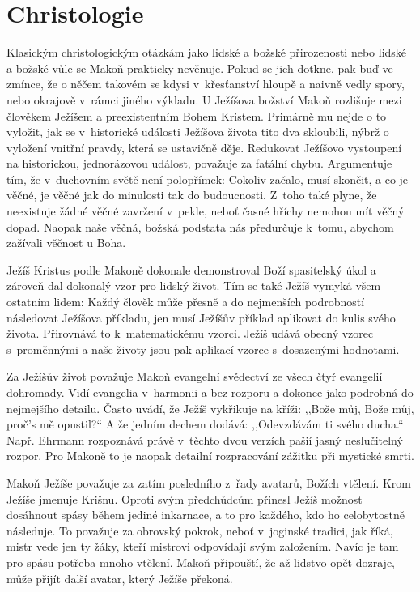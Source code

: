 \section{Christologie}

Klasickým christologickým otázkám jako lidské a božské přirozenosti nebo lidské
a božské vůle se Makoň prakticky nevěnuje. Pokud se jich dotkne, pak buď ve
zmínce, že o něčem takovém se kdysi v~křesťanství hloupě a naivně vedly spory,
nebo okrajově v~rámci jiného výkladu. U Ježíšova božství Makoň rozlišuje mezi
člověkem Ježíšem a preexistentním Bohem Kristem. Primárně mu nejde o to
vyložit, jak se v~historické události Ježíšova života tito dva skloubili, nýbrž
o vyložení vnitřní pravdy, která se ustavičně děje. Redukovat Ježíšovo
vystoupení na historickou, jednorázovou událost, považuje za fatální chybu.
Argumentuje tím, že v~duchovním světě není polopřímek: Cokoliv začalo, musí
skončit, a co je věčné, je věčné jak do minulosti tak do
budoucnosti. Z~toho
také plyne, že neexistuje žádné věčné zavržení v~pekle, neboť časné hříchy
nemohou mít věčný dopad. Naopak naše věčná, božská podstata nás předurčuje
k~tomu, abychom zažívali věčnost u Boha.

Ježíš Kristus podle Makoně dokonale demonstroval Boží spasitelský úkol a zároveň
dal dokonalý vzor pro lidský život. Tím se také Ježíš vymyká všem ostatním
lidem: Každý člověk může přesně a do nejmenších podrobností následovat Ježíšova
příkladu, jen musí Ježíšův příklad aplikovat do kulis svého života. Přirovnává
to k~matematickému vzorci. Ježíš udává obecný vzorec s~proměnnými a naše životy
jsou pak aplikací vzorce s~dosazenými hodnotami.

Za Ježíšův život považuje Makoň evangelní svědectví ze všech čtyř evangelií
dohromady. Vidí evangelia v~harmonii a bez rozporu a dokonce jako podrobná do
nejmejšího detailu. Často uvádí, že Ježíš
vykřikuje na kříži: ,,Bože můj, Bože můj, proč's mě opustil?{}`` A že jedním
dechem dodává: ,,Odevzdávám ti svého ducha.`` Např. Ehrmann rozpoznává právě
v~těchto dvou verzích pašií jasný neslučitelný rozpor.\cite{ehrman2000new} Pro
Makoně to je naopak detailní rozpracování zážitku při mystické smrti.

Makoň Ježíše považuje za zatím posledního z~řady avatarů, Božích
vtělení. Krom
Ježíše jmenuje Krišnu. Oproti svým předchůdcům přinesl Ježíš možnost dosáhnout spásy
během jediné inkarnace, a to pro každého, kdo ho celobytostně následuje. To
považuje za obrovský pokrok, neboť v~joginské tradici, jak říká, mistr vede jen
ty žáky, kteří mistrovi odpovídají svým založením. Navíc je tam pro spásu
potřeba mnoho vtělení. Makoň připouští, že až lidstvo opět dozraje, může přijít
další avatar, který Ježíše překoná.%

